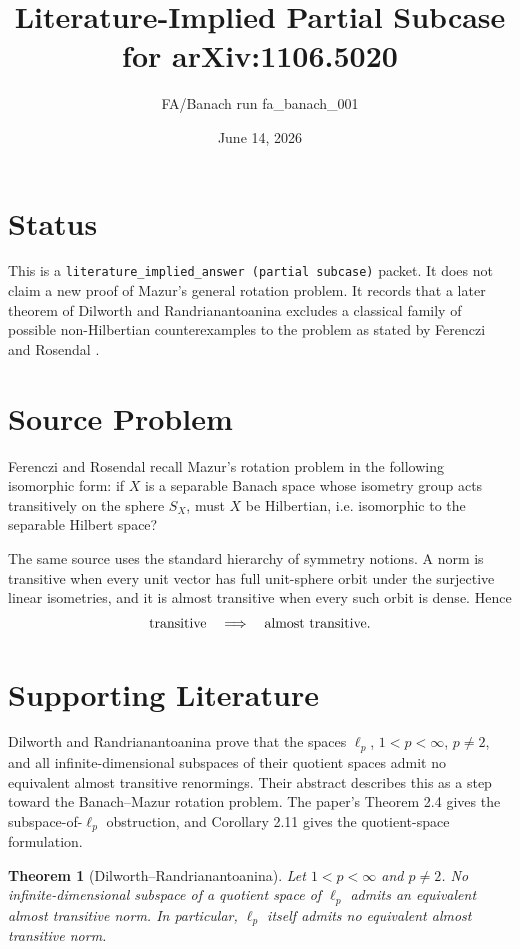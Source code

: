 \documentclass[11pt]{article}
\title{Literature-Implied Partial Subcase for arXiv:1106.5020}
\author{FA/Banach run fa\_banach\_001}
\date{June 14, 2026}
\newtheorem{theorem}{Theorem}
\begin{document}
\maketitle

\section*{Status}

This is a \texttt{literature\_implied\_answer (partial subcase)} packet. It
does not claim a new proof of Mazur's general rotation problem. It records
that a later theorem of Dilworth and Randrianantoanina
\cite{DilworthRandrianantoanina2013} excludes a classical family of possible
non-Hilbertian counterexamples to the problem as stated by Ferenczi and
Rosendal \cite{FerencziRosendal2011}.

\section*{Source Problem}

Ferenczi and Rosendal recall Mazur's rotation problem in the following
isomorphic form: if $X$ is a separable Banach space whose isometry group acts
transitively on the sphere $S_X$, must $X$ be Hilbertian, i.e. isomorphic to
the separable Hilbert space?

The same source uses the standard hierarchy of symmetry notions. A norm is
transitive when every unit vector has full unit-sphere orbit under the
surjective linear isometries, and it is almost transitive when every such orbit
is dense. Hence
\[
  \hbox{transitive} \quad \Longrightarrow \quad \hbox{almost transitive}.
\]

\section*{Supporting Literature}

Dilworth and Randrianantoanina prove that the spaces $\ell_p$,
$1<p<\infty$, $p\ne 2$, and all infinite-dimensional subspaces of their
quotient spaces admit no equivalent almost transitive renormings. Their
abstract describes this as a step toward the Banach--Mazur rotation problem.
The paper's Theorem 2.4 gives the subspace-of-$\ell_p$ obstruction, and
Corollary 2.11 gives the quotient-space formulation.

\begin{theorem}[Dilworth--Randrianantoanina]
Let $1<p<\infty$ and $p\ne 2$. No infinite-dimensional subspace of a quotient
space of $\ell_p$ admits an equivalent almost transitive norm. In particular,
$\ell_p$ itself admits no equivalent almost transitive norm.
\end{theorem}
\end{document}
